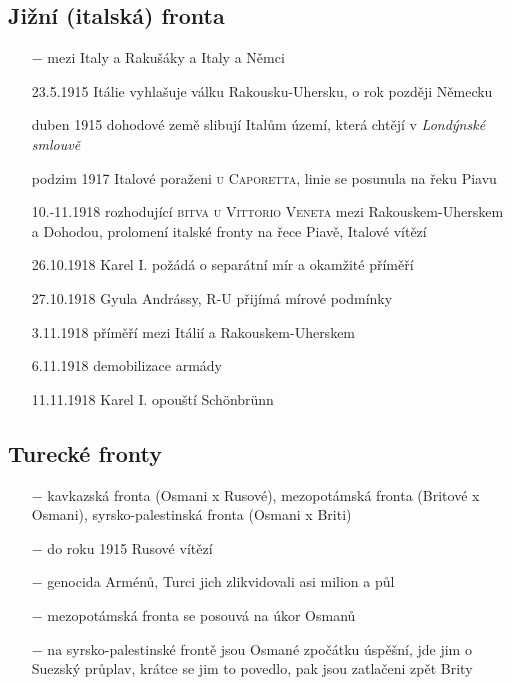 \documentclass{article}
\begin{document}
\subsection*{Jižní (italská) fronta}
\begin{itemize}
    \vspace{-0.5em}
    \setlength\itemsep{0.15em}
    \item[$-$] mezi Italy a Rakušáky a Italy a Němci
    \item[23.5.1915] Itálie vyhlašuje válku Rakousku-Uhersku, o rok později Německu
    \item[duben 1915] dohodové země slibují Italům území, která chtějí v \textit{Londýnské smlouvě}
    \item[podzim 1917] Italové poraženi \textsc{u Caporetta}, linie se posunula na řeku Piavu
    \item[10.-11.1918] rozhodující \textsc{bitva u Vittorio Veneta} mezi Rakouskem-Uherskem a Dohodou, prolomení italské fronty na řece Piavě, Italové vítězí
    \item[26.10.1918] Karel I. požádá o separátní mír a okamžité příměří
    \item[27.10.1918] Gyula Andrássy, R-U přijímá mírové podmínky
    \item[3.11.1918] příměří mezi Itálií a Rakouskem-Uherskem
    \item[6.11.1918] demobilizace armády
    \item[11.11.1918] Karel I. opouští Schönbrünn
\end{itemize}

\subsection*{Turecké fronty}
\begin{itemize}
    \vspace{-0.5em}
    \setlength\itemsep{0.15em}
    \item[$-$] kavkazská fronta (Osmani x Rusové), mezopotámská fronta (Britové x Osmani), syrsko-palestinská fronta (Osmani x Briti)
    \item[$-$] do roku 1915 Rusové vítězí
    \item[$-$] genocida Arménů, Turci jich zlikvidovali asi milion a půl
    \item[$-$] mezopotámská fronta se posouvá na úkor Osmanů
    \item[$-$] na syrsko-palestinské frontě jsou Osmané zpočátku úspěšní, jde jim o Suezský průplav, krátce se jim to povedlo, pak jsou zatlačeni zpět Brity
\end{itemize}
\end{document}
